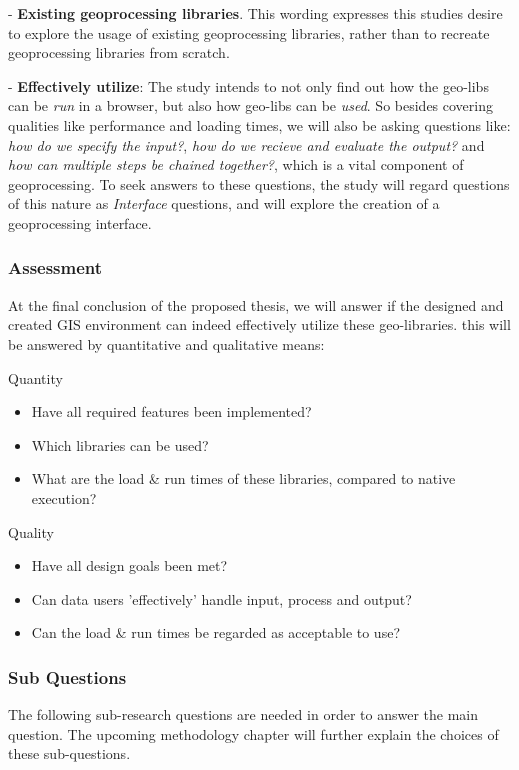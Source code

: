 - \textbf{Existing geoprocessing libraries}. This wording expresses this studies desire to explore the usage of existing geoprocessing libraries, rather than to recreate geoprocessing libraries from scratch.

- \textbf{Effectively utilize}: The study intends to not only find out how the geo-libs can be \textit{run} in a browser, but also how geo-libs can be \textit{used}. So besides covering qualities like performance and loading times, we will also be asking questions like: \textit{how do we specify the input?}, \textit{how do we recieve and evaluate the output?} and \textit{how can multiple steps be chained together?}, which is a vital component of geoprocessing. To seek answers to these questions, the study will regard questions of this nature as \textit{Interface} questions, and will explore the creation of a geoprocessing interface. 

\subsubsection*{Assessment}

At the final conclusion of the proposed thesis, we will answer if the designed and created GIS environment can indeed effectively utilize these geo-libraries.
this will be answered by quantitative and qualitative means:

Quantity
\begin{itemize}
    \item Have all required features been implemented?
    \item Which libraries can be used?
    \item What are the load \& run times of these libraries, compared to native execution?
\end{itemize} 

Quality
\begin{itemize}
    \item Have all design goals been met?
    \item Can data users 'effectively' handle input, process and output?
    \item Can the load \& run times be regarded as acceptable to use? 
\end{itemize} 


\subsubsection*{Sub Questions}

The following sub-research questions are needed in order to answer the main question. The upcoming methodology chapter will further explain the choices of these sub-questions. 


